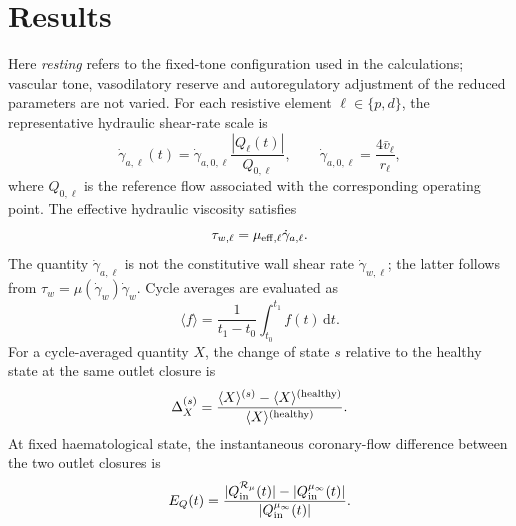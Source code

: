 \documentclass[lineno]{jfm}
\begin{document}
\section{Results}
\label{sec:results}
Here \emph{resting} refers to the fixed-tone configuration used in the
calculations; vascular tone, vasodilatory reserve and autoregulatory adjustment
of the reduced parameters are not varied.
For each resistive element $\ell\in\{p,d\}$, the representative hydraulic
shear-rate scale is
\begin{equation}
\dot{\gamma}_{a,\ell}(t)
=
\dot{\gamma}_{a,0,\ell}
\frac{|Q_\ell(t)|}{Q_{0,\ell}},
\qquad
\dot{\gamma}_{a,0,\ell}
=
\frac{4\bar v_\ell}{r_\ell},
\label{eq:results-shear-rate}
\end{equation}
where $Q_{0,\ell}$ is the reference flow associated with the corresponding
operating point. The effective hydraulic viscosity satisfies
\begin{equation}
\tau_{w,\ell}
=
\mu_{{\rm eff},\ell}
\dot{\gamma}_{a,\ell}.
\label{eq:results-effective-viscosity}
\end{equation}
The quantity $\dot{\gamma}_{a,\ell}$ is not the constitutive wall shear rate
$\dot{\gamma}_{w,\ell}$; the latter follows from
$\tau_w=\mu(\dot{\gamma}_w)\dot{\gamma}_w$.
Cycle averages are evaluated as
\begin{equation}
\langle f\rangle
=
\frac{1}{t_1-t_0}
\int_{t_0}^{t_1}
f(t)\,\mathrm{d}t.
\label{eq:cycle-average}
\end{equation}
For a cycle-averaged quantity $X$, the change of state $s$ relative to the
healthy state at the same outlet closure is
\begin{equation}
\Delta_X^{(s)}
=
\frac{
\langle X\rangle^{(s)}
-
\langle X\rangle^{({\rm healthy})}
}{
\langle X\rangle^{({\rm healthy})}
}.
\label{eq:state-change}
\end{equation}
At fixed haematological state, the instantaneous coronary-flow difference
between the two outlet closures is
\begin{equation}
E_Q(t)
=
\frac{
|Q_{\rm in}^{\mathcal{R}_{\mu}}(t)|
-
|Q_{\rm in}^{\mu_\infty}(t)|
}{
|Q_{\rm in}^{\mu_\infty}(t)|
}.
\label{eq:closure-flow-error}
\end{equation}
\end{document}
